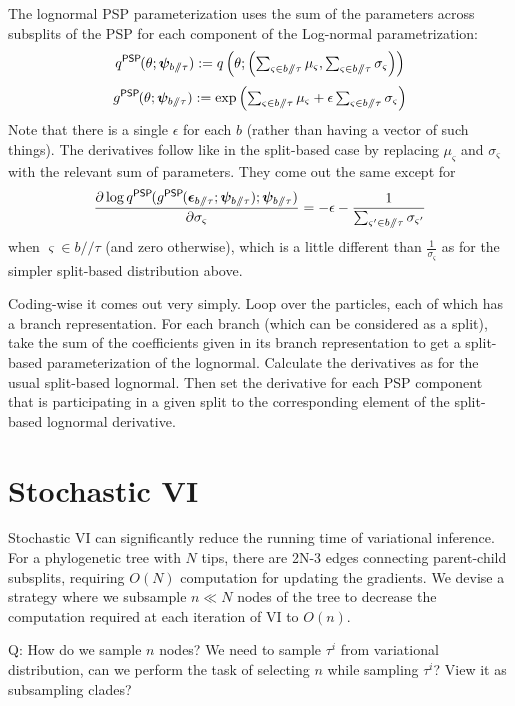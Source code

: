 \documentclass{article}
\newcommand{\psp}{\slash\!\!\slash}
\newcommand{\qPSP}{q^\textsf{PSP}\hspace{-1pt}}
\newcommand{\gPSP}{g^\textsf{PSP}\hspace{-1pt}}
\begin{document}
The lognormal PSP parameterization uses the sum of the parameters across subsplits of the PSP for each component of the Log-normal parametrization:
\[
\qPSP(\theta; \bm\psi_{b \psp \tau}) :=
q\left(\theta; \left(
        \textstyle\sum_{\varsigma \in b \psp \tau} \mu_\varsigma,
        \textstyle\sum_{\varsigma \in b \psp \tau} \sigma_\varsigma
    \right)\right)
\]
\[
\gPSP(\theta; \bm\psi_{b \psp \tau}) :=
    \exp \left(
        \textstyle\sum_{\varsigma \in b \psp \tau} \mu_\varsigma +
        \epsilon
        \textstyle\sum_{\varsigma \in b \psp \tau} \sigma_\varsigma
    \right)
\]
Note that there is a single $\epsilon$ for each $b$ (rather than having a vector of such things).
The derivatives follow like in the split-based case by replacing $\mu_\varsigma$ and $\sigma_\varsigma$ with the relevant sum of parameters.
They come out the same except for
\[
    \frac
    {\partial \log \qPSP(\gPSP(\bm\epsilon_{b \psp \tau}; \bm\psi_{b \psp \tau}); \bm\psi_{b \psp \tau})}
    {\partial \sigma_{\varsigma}}
    =
    - \epsilon
    - \frac{1}{\textstyle\sum_{\varsigma' \in b \psp \tau} \sigma_{\varsigma'}}
\]
when $\varsigma \in b \psp \tau$ (and zero otherwise), which is a little different than $\frac{1}{\sigma_\varsigma}$ as for the simpler split-based distribution above.

Coding-wise it comes out very simply.
Loop over the particles, each of which has a branch representation.
For each branch (which can be considered as a split), take the sum of the coefficients given in its branch representation to get a split-based parameterization of the lognormal.
Calculate the derivatives as for the usual split-based lognormal.
Then set the derivative for each PSP component that is participating in a given split to the corresponding element of the split-based lognormal derivative.


\section*{Stochastic VI}
Stochastic VI can significantly reduce the running time of variational inference.
For a phylogenetic tree with $N$ tips, there are 2N-3 edges connecting parent-child subsplits, requiring $O(N)$ computation for updating the gradients.
We devise a strategy where we subsample $n \ll N$ nodes of the tree to decrease the computation required at each iteration of VI to $O(n)$.

Q: How do we sample $n$ nodes? We need to sample $\tau^i$ from variational distribution, can we perform the task of selecting $n$ while sampling $\tau^i$? View it as subsampling clades?

\nocite{vbpi}



\end{document}
